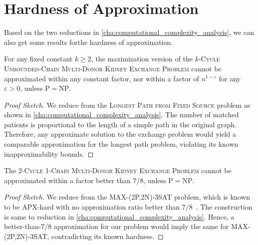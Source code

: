 \section{Hardness of Approximation}

Based on the two reductions in \autoref{cha:computational_complexity_analysis}, we can also get some results forthe  hardness of approximation.

\begin{lemma}
For any fixed constant $k \ge 2$, the maximization version of the \textsc{$k$-Cycle Unbounded-Chain Multi-Donor Kidney Exchange Problem} cannot be approximated within any constant factor, nor within a factor of $n^{1 - \varepsilon}$ for any $\varepsilon > 0$, unless $\mathrm{P} = \mathrm{NP}$.
\end{lemma}

\begin{proof}[Proof Sketch]
We reduce from the \textsc{Longest Path from Fixed Source} problem as shown in \autoref{cha:computational_complexity_analysis}. The number of matched patients is proportional to the length of a simple path in the original graph. Therefore, any approximate solution to the exchange problem would yield a comparable approximation for the longest path problem, violating its known inapproximability bounds.
\end{proof}

\begin{lemma}
The \textsc{2-Cycle 1-Chain Multi-Donor Kidney Exchange Problem} cannot be approximated within a factor better than $7/8$, unless $\mathrm{P} = \mathrm{NP}$.
\end{lemma}

\begin{proof}[Proof Sketch]
We reduce from the \textsc{MAX-(2P,2N)-3SAT} problem, which is known to be APX-hard with no approximation ratio better than $7/8$~\cite{berman2003restricted}. The construction is same to reduction in \autoref{cha:computational_complexity_analysis}. Hence, a better-than-$7/8$ approximation for our problem would imply the same for \textsc{MAX-(2P,2N)-3SAT}, contradicting its known hardness.
\end{proof}



